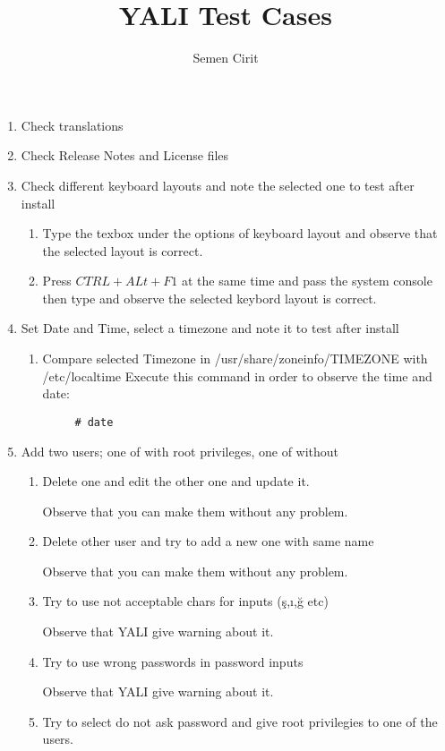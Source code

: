 \documentclass[a4paper,10pt]{article}
\title{YALI Test Cases}
\author{Semen Cirit}
\begin{document}
\maketitle
\begin{enumerate}
\item Check translations
\item Check Release Notes and License files
\item Check different keyboard layouts and note the selected one to test after install
    \begin{enumerate}
      \item Type the texbox under the options of keyboard layout and observe that the selected layout is correct.
      \item Press $CTRL+ALt+F1$ at the same time and pass the system console then type and observe the selected keybord layout is correct.
    \end{enumerate}
\item Set Date and Time, select a timezone and note it to test after install
    \begin{enumerate}
        \item Compare selected Timezone in /usr/share/zoneinfo/TIMEZONE with /etc/localtime
    Execute this command in order to observe the time and date:
	\begin{verbatim}
	 # date
	\end{verbatim}
    \end{enumerate}
\item Add two users; one of with root privileges, one of without
    \begin{enumerate}
        \item Delete one and edit the other one and update it.

        Observe that you can make them without any problem.

        \item Delete other user and try to add a new one with same name

        Observe that you can make them without any problem.
        \item Try to use not acceptable chars for inputs (ş,ı,ğ etc)

        Observe that YALI give warning about it.
        \item Try to use wrong passwords in password inputs

        Observe that YALI give warning about it.
        \item Try to select do not ask password and give root privilegies to one of the users.


\end{enumerate}
\end{enumerate}
\end{document}
